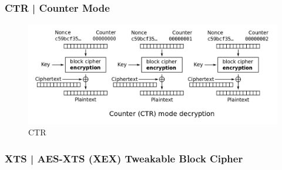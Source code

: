 \textsf{\small }

\subsubsection{CTR | Counter Mode}


\textsf{\small }

\begin{figure}[H]
	\centering
	\includegraphics[width=1\textwidth, height=1\textheight, keepaspectratio]{./images/aes_modes/ctr.png}
	\caption{CTR}
	\label{fig:ctr}
\end{figure}

\subsubsection{XTS | AES-XTS (XEX) Tweakable Block Cipher}





